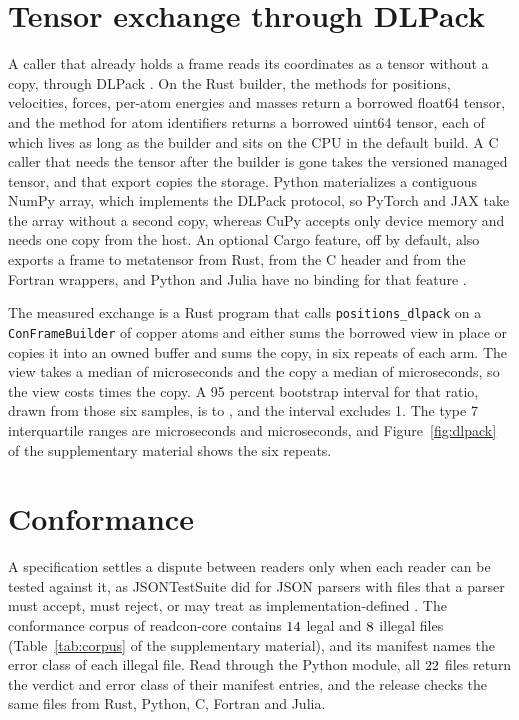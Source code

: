 \documentclass[preprint,12pt]{elsarticle}
\begin{document}
\section{Tensor exchange through DLPack}\label{sec:dlpack} A caller that already holds a frame reads its coordinates as a tensor without a copy, through DLPack \cite{dlpackDLPack2026}.
On the Rust builder, the methods for positions, velocities, forces, per-atom energies and masses return a borrowed float64 tensor, and the method for atom identifiers returns a borrowed uint64 tensor, each of which lives as long as the builder and sits on the CPU in the default build.
A C caller that needs the tensor after the builder is gone takes the versioned managed tensor, and that export copies the storage.
Python materializes a contiguous NumPy array, which implements the DLPack protocol, so PyTorch and JAX take the array without a second copy, whereas CuPy accepts only device memory and needs one copy from the host.
An optional Cargo feature, off by default, also exports a frame to metatensor from Rust, from the C header and from the Fortran wrappers, and Python and Julia have no binding for that feature \cite{bigiMetatensorMetatomicFoundational2026}.

The measured exchange is a Rust program that calls \texttt{positions\_dlpack} on a \texttt{ConFrameBuilder} of \dlpackAtoms{} copper atoms and either sums the borrowed view in place or copies it into an owned buffer and sums the copy, in six repeats of each arm.
The view takes a median of \dlpackViewUs{} microseconds and the copy a median of \dlpackCopyUs{} microseconds, so the view costs \dlpackRatio{} times the copy.
A 95 percent bootstrap interval for that ratio, drawn from those six samples, is \dlpackRatioLo{} to \dlpackRatioHi{}, and the interval excludes 1.
The type 7 interquartile ranges are \dlpackViewIqr{} microseconds and \dlpackCopyIqr{} microseconds, and Figure~\ref*{fig:dlpack} of the supplementary material shows the six repeats.

\section{Conformance}\label{sec:conformance} A specification settles a dispute between readers only when each reader can be tested against it, as JSONTestSuite did for JSON parsers with files that a parser must accept, must reject, or may treat as implementation-defined \cite{seriotParsingJsonMinefield2016}.
The conformance corpus of readcon-core contains \(14\) legal and \(8\) illegal files (Table~\ref{tab:corpus} of the supplementary material), and its manifest names the error class of each illegal file.
Read through the Python module, all \(22\) files return the verdict and error class of their manifest entries, and the release checks the same files from Rust, Python, C, Fortran and Julia.
\end{document}
